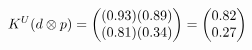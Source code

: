 \documentclass[preview]{standalone}
\begin{document}
\begin{align*}
\special{dvisvgm:raw <g id='unique000'>}K^U(d \otimes p) = \begin{pmatrix} (0.93)(0.89) \\ (0.81)(0.34) \end{pmatrix} = \begin{pmatrix} 0.82 \\ 0.27 \end{pmatrix}\special{dvisvgm:raw </g>}
\end{align*}
\end{document}
